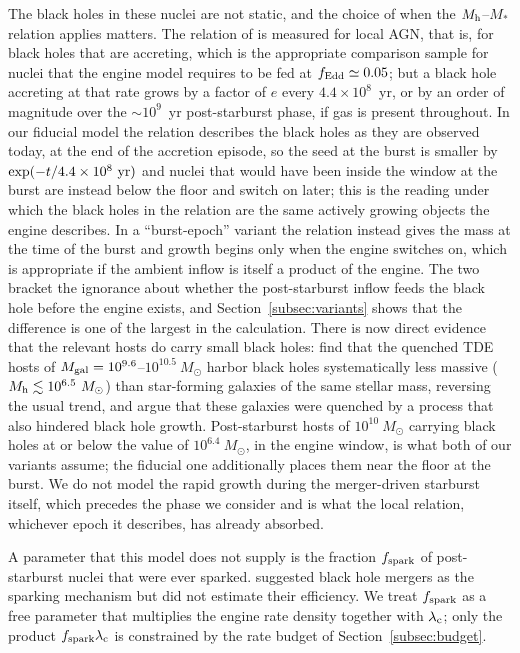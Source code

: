 \documentclass[twocolumn,pdftex]{aastex701}
\newcommand{\msun}{M_{\odot}\xspace}
\newcommand{\fspark}{f_{\rm spark}\xspace}
\newcommand{\lamc}{\lambda_{\rm c}\xspace}
\begin{document}
The black holes in these nuclei are not static, and the choice of when the $M_{\rm h}$--$M_\ast$ relation applies matters. The relation of \citet{Reines:2015a} is measured for local AGN, that is, for black holes that are accreting, which is the appropriate comparison sample for nuclei that the engine model requires to be fed at $f_{\rm Edd} \simeq 0.05$; but a black hole accreting at that rate grows by a factor of $e$ every $4.4 \times 10^{8}$~yr, or by an order of magnitude over the $\sim 10^{9}$~yr post-starburst phase, if gas is present throughout. In our fiducial model the relation describes the black holes as they are observed today, at the end of the accretion episode, so the seed at the burst is smaller by $\exp(-t/4.4 \times 10^{8}~{\rm yr})$ and nuclei that would have been inside the window at the burst are instead below the floor and switch on later; this is the reading under which the black holes in the relation are the same actively growing objects the engine describes. In a ``burst-epoch'' variant the relation instead gives the mass at the time of the burst and growth begins only when the engine switches on, which is appropriate if the ambient inflow is itself a product of the engine. The two bracket the ignorance about whether the post-starburst inflow feeds the black hole before the engine exists, and Section~\ref{subsec:variants} shows that the difference is one of the largest in the calculation. There is now direct evidence that the relevant hosts do carry small black holes: \citet{Ramsden:2026a} find that the quenched TDE hosts of $M_{\rm gal} = 10^{9.6}$--$10^{10.5}~\msun$ harbor black holes systematically less massive ($M_{\rm h} \lesssim 10^{6.5}~\msun$) than star-forming galaxies of the same stellar mass, reversing the usual trend, and argue that these galaxies were quenched by a process that also hindered black hole growth. Post-starburst hosts of $10^{10}~\msun$ carrying black holes at or below the \citet{Reines:2015a} value of $10^{6.4}~\msun$, in the engine window, is what both of our variants assume; the fiducial one additionally places them near the floor at the burst. We do not model the rapid growth during the merger-driven starburst itself, which precedes the phase we consider and is what the local relation, whichever epoch it describes, has already absorbed.

A parameter that this model does not supply is the fraction $\fspark$ of post-starburst nuclei that were ever sparked. \citet{Guillochon:2026a} suggested black hole mergers as the sparking mechanism but did not estimate their efficiency. We treat $\fspark$ as a free parameter that multiplies the engine rate density together with $\lamc$; only the product $\fspark \lamc$ is constrained by the rate budget of Section~\ref{subsec:budget}.
\end{document}
